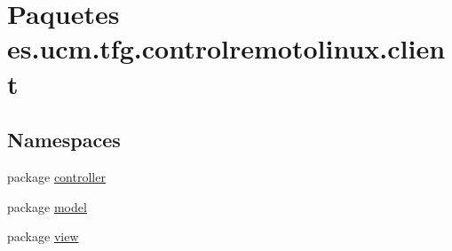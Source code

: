 \hypertarget{namespacees_1_1ucm_1_1tfg_1_1controlremotolinux_1_1client}{\section{Paquetes es.\-ucm.\-tfg.\-controlremotolinux.\-client}
\label{namespacees_1_1ucm_1_1tfg_1_1controlremotolinux_1_1client}
}
\subsection*{Namespaces}
\begin{DoxyCompactItemize}
\item 
package \hyperlink{namespacees_1_1ucm_1_1tfg_1_1controlremotolinux_1_1client_1_1controller}{controller}
\item 
package \hyperlink{namespacees_1_1ucm_1_1tfg_1_1controlremotolinux_1_1client_1_1model}{model}
\item 
package \hyperlink{namespacees_1_1ucm_1_1tfg_1_1controlremotolinux_1_1client_1_1view}{view}
\end{DoxyCompactItemize}
